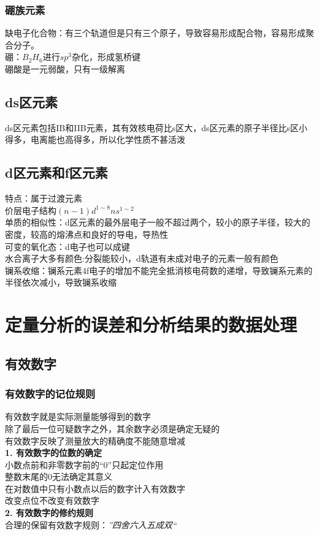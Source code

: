 \documentclass[utf8,a4paper,12pt]{ctexart}
\begin{document}
\subsubsection{硼族元素}
缺电子化合物：有三个轨道但是只有三个原子，导致容易形成配合物，容易形成聚合分子。\\
硼：$B_2H_6$进行$sp^3$杂化，形成氢桥键\\
硼酸是一元弱酸，只有一级解离\\
\subsection{ds区元素}
ds区元素包括IB和IIB元素，其有效核电荷比s区大，ds区元素的原子半径比s区小得多，电离能也高得多，所以化学性质不甚活泼\\
\subsection{d区元素和f区元素}
特点：属于过渡元素\\
价层电子结构$(n-1)d^{1\sim8}ns^{1\sim2}$\\
单质的相似性：d区元素的最外层电子一般不超过两个，较小的原子半径，较大的密度，较高的熔沸点和良好的导电，导热性\\
可变的氧化态：d电子也可以成键\\
水合离子大多有颜色:分裂能较小，d轨道有未成对电子的元素一般有颜色\\
镧系收缩：镧系元素4f电子的增加不能完全抵消核电荷数的递增，导致镧系元素的半径依次减小，导致镧系收缩\\
\newpage
\section{定量分析的误差和分析结果的数据处理}
\subsection{有效数字}
\subsubsection{有效数字的记位规则}
有效数字就是实际测量能够得到的数字\\
除了最后一位可疑数字之外，其余数字必须是确定无疑的\\
有效数字反映了测量放大的精确度不能随意增减\\
{\bf 1. 有效数字的位数的确定}\\
小数点前和非零数字前的“0”只起定位作用\\
整数末尾的0无法确定其意义\\
在对数值中只有小数点以后的数字计入有效数字\\
改变点位不改变有效数字\\
{\bf 2. 有效数字的修约规则}\\
合理的保留有效数字规则：\emph{”四舍六入五成双“}\\
\end{document}
